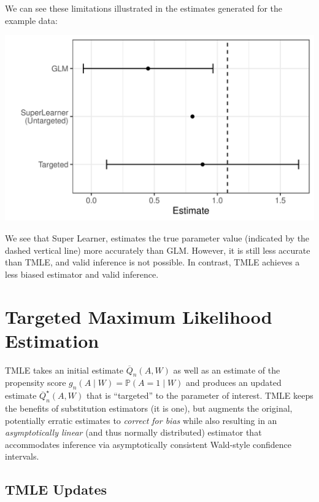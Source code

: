 \documentclass[
  12pt, krantz2,
]{krantz}
\newcommand{\1}{\mathbbm{1}}
\theoremstyle{definition}
\theoremstyle{definition}
\theoremstyle{definition}
\theoremstyle{definition}
\theoremstyle{remark}
\begin{document}
We can see these limitations illustrated in the estimates generated for the
example data:

\begin{center}\includegraphics[width=0.8\linewidth]{img/png/schematic_3_effects} \end{center}

We see that Super Learner, estimates the true parameter value (indicated by the
dashed vertical line) more accurately than GLM. However, it is still less
accurate than TMLE, and valid inference is not possible. In contrast, TMLE
achieves a less biased estimator and valid inference.

\hypertarget{tmle}{%
\section{Targeted Maximum Likelihood Estimation}\label{tmle}}

TMLE takes an initial estimate \(\overline{Q}_n(A,W)\) as well as an estimate of
the propensity score \(g_n(A \mid W) = \mathbb{P}(A = 1 \mid W)\) and produces an
updated estimate \(\overline{Q}^{\star}_n(A,W)\) that is ``targeted'' to the
parameter of interest. TMLE keeps the benefits of substitution estimators (it is
one), but augments the original, potentially erratic estimates to \emph{correct for
bias} while also resulting in an \emph{asymptotically linear} (and thus normally
distributed) estimator that accommodates inference via asymptotically consistent
Wald-style confidence intervals.

\hypertarget{tmle-updates}{%
\subsection{TMLE Updates}\label{tmle-updates}}
\end{document}
